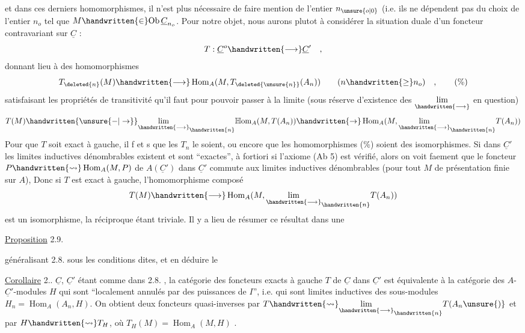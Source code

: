et dans ces derniers homomorphismes, il n'est plus nécessaire de faire
mention de l'entier $n_{\unsure{o|0}}$ (i.e. ils ne dépendent pas du choix de l'entier
$n_o$ tel que $M\handwritten{\in}\mathrm{Ob}\,\underline C_{n_o}$\handwritten{)}. Pour notre objet, nous aurons plutot à considérer la situation duale d'un foncteur contravariant sur $\underline C$ :
\[
T:\underline C^o\handwritten{\longrightarrow}\underline C'\quad,
\]
donnant lieu à des homomorphismes
\[
T_{\deleted{n}}(M)\handwritten{\longrightarrow}\operatorname{Hom}_A(M,T_{\deleted{\unsure{n}}}(A_n))\qquad(n\handwritten{\geq}n_o)\quad,\tag*{(\%)}
\]
satisfaisant les propriétés de transitivité qu'il faut pour pouvoir passer
à la limite (sous réserve d'existence des $\underset{\handwritten{\longrightarrow}}{\lim}$ en question)
\[
T(M)\handwritten{\unsure{-|\to}}\underset{\handwritten{\longrightarrow}}{\lim}_{\handwritten{n}}\mathbb H\mathrm{om}_A(M,T(A_n))\handwritten{\to}\operatorname{Hom}_A(M,\underset{\handwritten{\longrightarrow}}{\lim}_{\handwritten{n}}T(A_n))
\]
Pour que $T$ soit exact à gauche, il f et s que les $T_n$ le soient, ou encore
que les homomorphismes (\%) soient des isomorphismes. Si dans $\underline C'$ les
limites inductives  dénombrables existent et sont ``exactes'', à fortiori
si l'axiome (Ab 5) est vérifié, alors  on voit faement que le foncteur
$P\handwritten{\leadsto}\operatorname{Hom}_A(M,P)$ de  $A(\underline C')$ dans $\underline C'$ commute aux limites inductives  dénombrables (pour tout $M$ de présentation finie sur $A$), Donc  si
 $T$ est exact à gauche, l'homomorphisme composé
\[
T(M)\handwritten{\longrightarrow}\operatorname{Hom}_A(M,\underset{\handwritten{\longrightarrow}}{\lim}_{\handwritten{n}}T(A_n))
\]
est un isomorphisme, la réciproque étant triviale. Il y a lieu de
résumer ce résultat dans une

\uline{Proposition} 2.9.

généralisant 2.8. sous les conditions dites, et en déduire le

\uline{Corollaire} 2.. $\underline C$, $\underline C'$ étant comme dans 2.8. , la catégorie des
foncteurs exacts à  gauche $T$ de $\underline C$ dans $\underline C'$ est équivalente à la
catégorie des $A$-$\underline C'$-modules $H$ qui sont ``localement annulés par des
puissances de $I$'', i.e. qui sont limites inductives des sous-modules
$H_n=\operatorname{Hom}_A(A_n,H)$. On obtient deux foncteurs quasi-inverses par $T\handwritten{\leadsto}\underset{\handwritten{\longrightarrow}}{\lim}_{\handwritten{n}}T(A_n\unsure{)}$
et par $H\handwritten{\leadsto}T_H$, où $T_H(M)=\operatorname{Hom}_A(M,H)$ .

